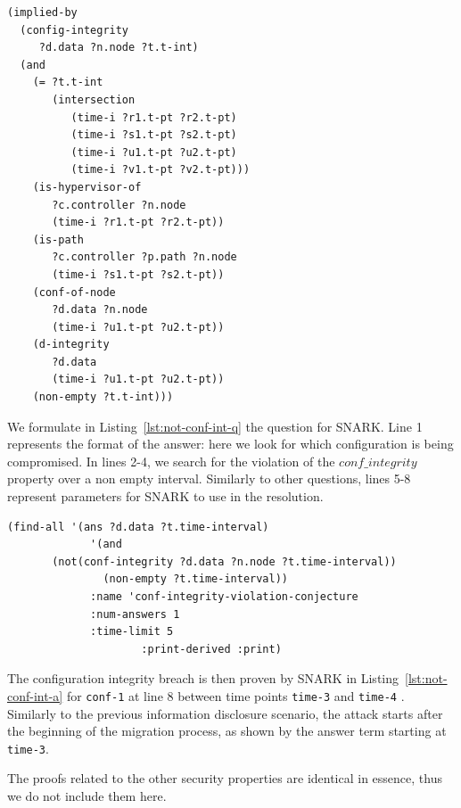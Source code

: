 \begin{lstlisting}[caption=SNARK definition of the configuration integrity., label=lst:conf-integrity-definition,captionpos=b] 
(implied-by
  (config-integrity 
     ?d.data ?n.node ?t.t-int)
  (and
    (= ?t.t-int
       (intersection
    	  (time-i ?r1.t-pt ?r2.t-pt)
    	  (time-i ?s1.t-pt ?s2.t-pt)
    	  (time-i ?u1.t-pt ?u2.t-pt)
    	  (time-i ?v1.t-pt ?v2.t-pt)))
    (is-hypervisor-of
       ?c.controller ?n.node 
       (time-i ?r1.t-pt ?r2.t-pt))
    (is-path 
	   ?c.controller ?p.path ?n.node
       (time-i ?s1.t-pt ?s2.t-pt))
    (conf-of-node
	   ?d.data ?n.node
       (time-i ?u1.t-pt ?u2.t-pt))
    (d-integrity
	   ?d.data
       (time-i ?u1.t-pt ?u2.t-pt))
    (non-empty ?t.t-int)))

\end{lstlisting}

We formulate in Listing~\ref{lst:not-conf-int-q} the question for SNARK.
Line 1 represents the format of the answer: here we look for which configuration is being compromised. In lines 2-4, we search for the violation of the $conf\_integrity$ property over a non empty interval. Similarly to other questions, lines 5-8 represent parameters for SNARK to use in the resolution.

\begin{lstlisting}[caption=SNARK question to detect the configuration integrity violation., label=lst:not-conf-int-q,captionpos=b] 
   (find-all '(ans ?d.data ?t.time-interval)
             '(and
       (not(conf-integrity ?d.data ?n.node ?t.time-interval))
               (non-empty ?t.time-interval))
             :name 'conf-integrity-violation-conjecture
             :num-answers 1
             :time-limit 5
                     :print-derived :print)
\end{lstlisting}

The configuration integrity breach is then proven by SNARK in Listing~\ref{lst:not-conf-int-a} for \verb'conf-1' at line 8 between time points \verb'time-3' and \verb'time-4' .
Similarly to the previous information disclosure scenario, the attack starts after the beginning of the migration process, as shown by the answer term starting at \verb'time-3'.

The proofs related to the other security properties are identical in essence, thus we do not include them here. 

